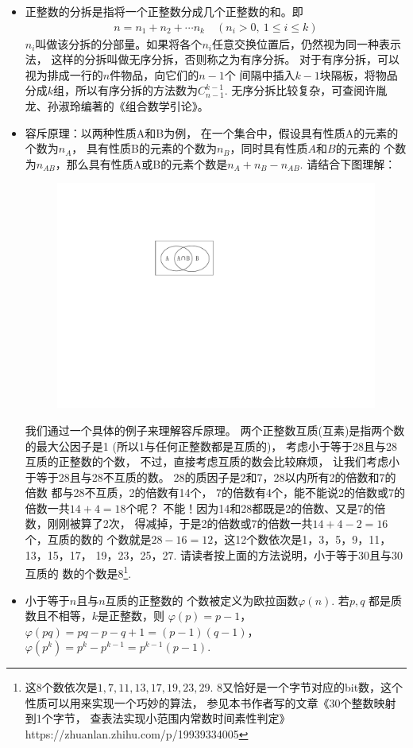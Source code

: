 \begin{itemize}[leftmargin=\inteval{\myitemleftmargin}pt,itemsep=
   \inteval{\myitemitempsep}pt,topsep=\inteval{\myitemtopsep}pt]
\item 正整数的分拆是指将一个正整数分成几个正整数的和。即
\begin{align*}
    n=n_1+n_2+\cdots n_k \quad (n_i>0,\ 1\leq i\leq k)
\end{align*}
$ n_i $叫做该分拆的分部量。如果将各个$ n_i $任意交换位置后，仍然视为同一种表示法，
这样的分拆叫做无序分拆，否则称之为有序分拆。
对于有序分拆，可以视为排成一行的$ n $件物品，向它们的$ n-1 $个
间隔中插入$ k-1 $块隔板，将物品分成$ k $组，所以有序分拆的方法数为$ C_{n-1}^{k-1} $. 
无序分拆比较复杂，可查阅许胤龙、孙淑玲编著的《组合数学引论》。

\item\label{容斥原理} 容斥原理：以两种性质A和B为例，
在一个集合中，假设具有性质A的元素的个数为$ n_A $，
具有性质B的元素的个数为$ n_B $，同时具有性质$ A $和$ B $的元素的
个数为$ n_{AB} $，那么具有性质A或B的元素个数是$ n_A+n_B-n_{AB} $.
请结合下图理解：
\begin{figure}[H]
    \centering
    \includegraphics[width=0.3\linewidth]{PDF_Picture/韦恩图-交集}
\end{figure}
我们通过一个具体的例子来理解容斥原理。
两个正整数互质(互素)是指两个数的最大公因子是1
(所以1与任何正整数都是互质的)，
考虑小于等于28且与28互质的正整数的个数，
不过，直接考虑互质的数会比较麻烦，
让我们考虑小于等于28且与28不互质的数。
28的质因子是2和7，28以内所有2的倍数和7的倍数
都与28不互质，2的倍数有14个，
7的倍数有4个，能不能说2的倍数或7的倍数一共$ 14+4=18 $个呢？
不能！因为14和28都既是2的倍数、又是7的倍数，刚刚被算了2次，
得减掉，于是2的倍数或7的倍数一共$ 14+4-2=16 $个，互质的数的
个数就是$ 28-16=12 $，这12个数依次是1，3，5，9，11，13，15，17，
19，23，25，27. 请读者按上面的方法说明，小于等于30且与30互质的
数的个数是8\footnote{这8个数依次是$ 1,7,11,13,17,19,23,29 $.\q 
    8又恰好是一个字节对应的bit数，这个性质可以用来实现一个巧妙的算法，
    参见本书作者写的文章《30个整数映射到1个字节，
    查表法实现小范围内常数时间素性判定》\\
    https://zhuanlan.zhihu.com/p/19939334005 }.

\item 小于等于$ n $且与$ n $互质的正整数的
个数被定义为欧拉函数$ \varphi(n) $. 
若$ p,q $ 都是质数且不相等，$ k $是正整数，则
$ \varphi(p)=p-1 $，$ \varphi(pq)=pq-p-q+1=(p-1)(q-1) $，
$ \varphi(p^k)=p^k-p^{k-1}=p^{k-1}(p-1) $.


\end{itemize}
